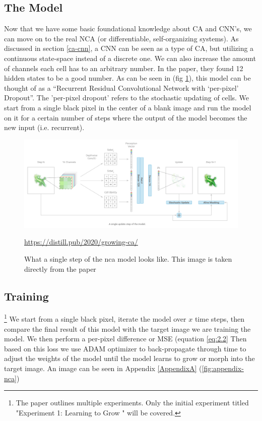 \subsection{The Model}
Now that we have some basic foundational knowledge about CA and CNN's, we can move on to the real NCA (or differentiable, self-organizing systems). As discussed in section \ref{ca-cnn}, a CNN can be seen as a type of CA, but utilizing a continuous state-space instead of a discrete one. We can also increase the amount of channels each cell has to an arbitrary number. In the paper, they found 12 hidden states to be a good number. As can be seen in (fig \ref{fig:nca}), this model can be thought of as a “Recurrent Residual Convolutional Network with ‘per-pixel’ Dropout”. The 'per-pixel dropout' refers to the stochastic updating of cells. We start from a single black pixel in the center of a blank image and run the model on it for a certain number of steps where the output of the model becomes the new input (i.e. recurrent).
\begin{figure}[h]
	\includegraphics[width=1\textwidth]{../Figures/growing_nca.png}
	\centering
	\caption[NCA]{What a single step of the nca model looks like. This image is taken directly from the  paper \cite{growing_nca}} 
	\label{fig:nca}
	\url{https://distill.pub/2020/growing-ca/}
\end{figure}

\subsection{Training} \footnote{The paper outlines multiple experiments. Only the initial experiment titled "Experiment 1: Learning to Grow " will be covered.}
We start from a single black pixel, iterate the model over $x$ time steps, then compare the final result of this model with the target image we are training the model. We then perform a per-pixel difference or MSE (equation \ref{eq:2.2} Then based on this loss we use ADAM optimizer to back-propagate through time to adjust the weights of the model until the model learns to grow or morph into the target image. An image can be seen in Appendix \ref{AppendixA} (\ref{fig:appendix-nca})

